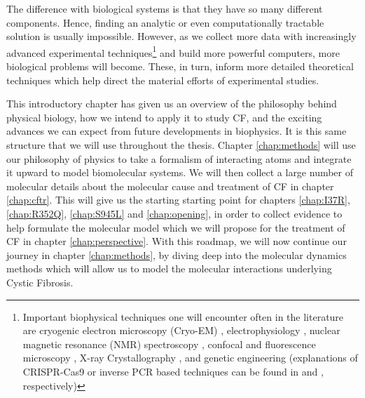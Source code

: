 The difference with biological systems is that they have so many different components. Hence, finding an analytic or even computationally tractable solution is usually impossible. However, as we collect more data with increasingly advanced experimental techniques\footnote{Important biophysical techniques one will encounter often in the literature are cryogenic electron microscopy (Cryo-EM) \cite{cheng2015, callaway2015, callaway2020}, electrophysiology \cite{aidley1996}, nuclear magnetic resonance (NMR) spectroscopy \cite{marion2013}, confocal and fluorescence microscopy \cite{sanderson2014}, X-ray Crystallography \cite{frauenfelder2010, drenth2006}, and genetic engineering (explanations of CRISPR-Cas9 or inverse PCR based techniques can be found in \cite{silva2017} and \cite{crispr2019}, respectively)} and build more powerful computers, more biological problems will become. These, in turn, inform more detailed theoretical techniques which help direct the material efforts of experimental studies. 

This introductory chapter has given us an overview of the philosophy behind physical biology, how we intend to apply it to study CF, and the exciting advances we can expect from future developments in biophysics. It is this same structure that we will use throughout the thesis. Chapter \ref{chap:methods} will use our philosophy of physics to take a formalism of interacting atoms and integrate it upward to model biomolecular systems. We will then collect a large number of molecular details about the molecular cause and treatment of CF in chapter \ref{chap:cftr}. This will give us the starting starting point for chapters \ref{chap:I37R}, \ref{chap:R352Q}, \ref{chap:S945L} and \ref{chap:opening}, in order to collect evidence to help formulate the molecular model which we will propose for the treatment of CF in chapter \ref{chap:perspective}. With this roadmap, we will now continue our journey in chapter \ref{chap:methods}, by diving deep into the molecular dynamics methods which will allow us to model the molecular interactions underlying Cystic Fibrosis.

